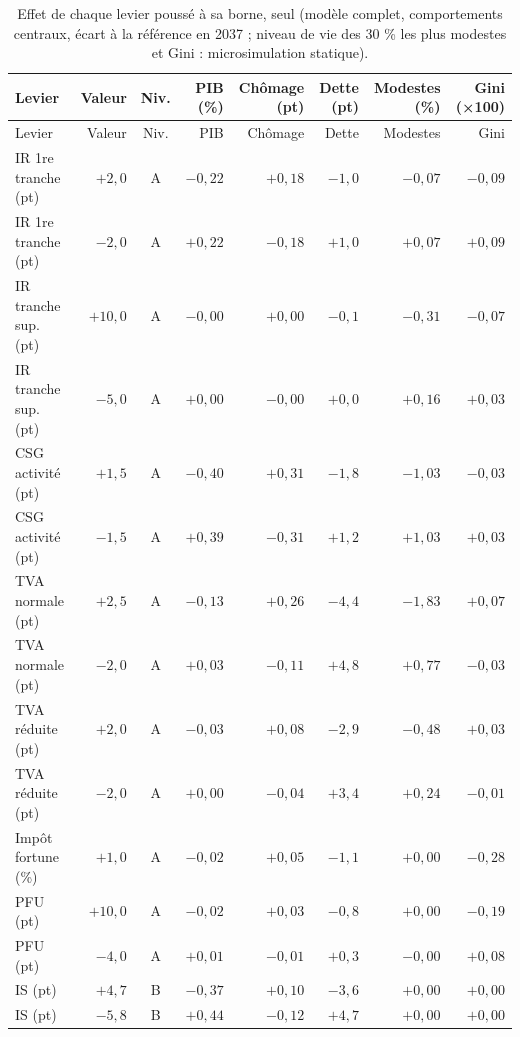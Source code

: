 {\scriptsize\setlength{\tabcolsep}{3pt}\begin{longtable}{p{4.2cm}rcrrrrr}\caption{Effet de chaque levier poussé à sa borne, seul (modèle complet, comportements centraux, écart à la référence en 2037 ; niveau de vie des 30 \% les plus modestes et Gini : microsimulation statique).}\label{tab:efficacite}\\ \toprule Levier & Valeur & Niv. & PIB (\%) & Chômage (pt) & Dette (pt) & Modestes (\%) & Gini (×100)\\ \midrule\endfirsthead \toprule Levier & Valeur & Niv. & PIB & Chômage & Dette & Modestes & Gini\\ \midrule\endhead
IR 1re tranche (pt) & $+2{,}0$ & A & $-0{,}22$ & $+0{,}18$ & $-1{,}0$ & $-0{,}07$ & $-0{,}09$\\
IR 1re tranche (pt) & $-2{,}0$ & A & $+0{,}22$ & $-0{,}18$ & $+1{,}0$ & $+0{,}07$ & $+0{,}09$\\
IR tranche sup. (pt) & $+10{,}0$ & A & $-0{,}00$ & $+0{,}00$ & $-0{,}1$ & $-0{,}31$ & $-0{,}07$\\
IR tranche sup. (pt) & $-5{,}0$ & A & $+0{,}00$ & $-0{,}00$ & $+0{,}0$ & $+0{,}16$ & $+0{,}03$\\
CSG activité (pt) & $+1{,}5$ & A & $-0{,}40$ & $+0{,}31$ & $-1{,}8$ & $-1{,}03$ & $-0{,}03$\\
CSG activité (pt) & $-1{,}5$ & A & $+0{,}39$ & $-0{,}31$ & $+1{,}2$ & $+1{,}03$ & $+0{,}03$\\
TVA normale (pt) & $+2{,}5$ & A & $-0{,}13$ & $+0{,}26$ & $-4{,}4$ & $-1{,}83$ & $+0{,}07$\\
TVA normale (pt) & $-2{,}0$ & A & $+0{,}03$ & $-0{,}11$ & $+4{,}8$ & $+0{,}77$ & $-0{,}03$\\
TVA réduite (pt) & $+2{,}0$ & A & $-0{,}03$ & $+0{,}08$ & $-2{,}9$ & $-0{,}48$ & $+0{,}03$\\
TVA réduite (pt) & $-2{,}0$ & A & $+0{,}00$ & $-0{,}04$ & $+3{,}4$ & $+0{,}24$ & $-0{,}01$\\
Impôt fortune (\%) & $+1{,}0$ & A & $-0{,}02$ & $+0{,}05$ & $-1{,}1$ & $+0{,}00$ & $-0{,}28$\\
PFU (pt) & $+10{,}0$ & A & $-0{,}02$ & $+0{,}03$ & $-0{,}8$ & $+0{,}00$ & $-0{,}19$\\
PFU (pt) & $-4{,}0$ & A & $+0{,}01$ & $-0{,}01$ & $+0{,}3$ & $-0{,}00$ & $+0{,}08$\\
IS (pt) & $+4{,}7$ & B & $-0{,}37$ & $+0{,}10$ & $-3{,}6$ & $+0{,}00$ & $+0{,}00$\\
IS (pt) & $-5{,}8$ & B & $+0{,}44$ & $-0{,}12$ & $+4{,}7$ & $+0{,}00$ & $+0{,}00$\\

\end{longtable}}
